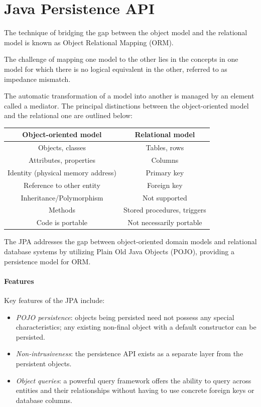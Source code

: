 \section{Java Persistence API}

The technique of bridging the gap between the object model and the relational model is known as Object Relational Mapping (ORM).
\begin{definition}
    The challenge of mapping one model to the other lies in the concepts in one model for which there is no logical equivalent in the other, referred to as impedance mismatch.
\end{definition}
The automatic transformation of a model into another is managed by an element called a mediator. 
The principal distinctions between the object-oriented model and the relational one are outlined below:
\begin{table}[H]
    \centering
    \begin{tabular}{cc}
    \hline
    \textbf{Object-oriented model}     & \textbf{Relational model}   \\ \hline
    Objects, classes                   & Tables, rows                \\
    Attributes, properties             & Columns                     \\
    Identity (physical memory address) & Primary key                 \\
    Reference to other entity          & Foreign key                 \\
    Inheritance/Polymorphism           & Not supported               \\
    Methods                            & Stored procedures, triggers \\
    Code is portable                   & Not necessarily portable    \\ \hline
    \end{tabular}
\end{table}
The JPA addresses the gap between object-oriented domain models and relational database systems by utilizing Plain Old Java Objects (POJO), providing a persistence model for ORM.

\paragraph*{Features}
Key features of the JPA include:
\begin{itemize}
    \item \textit{POJO persistence}: objects being persisted need not possess any special characteristics; any existing non-final object with a default constructor can be persisted.
    \item \textit{Non-intrusiveness}: the persistence API exists as a separate layer from the persistent objects.
    \item \textit{Object queries}: a powerful query framework offers the ability to query across entities and their relationships without having to use concrete foreign keys or database columns.
\end{itemize}

